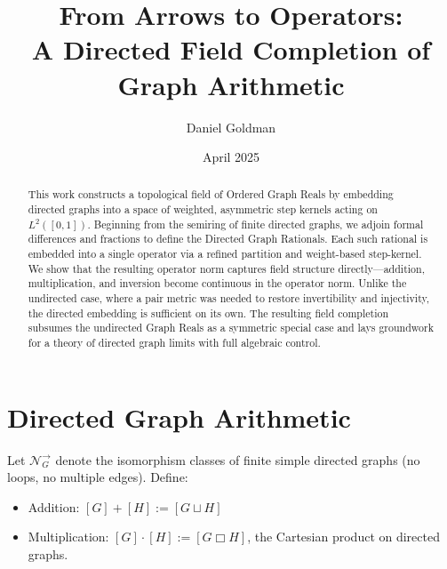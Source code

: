 \documentclass[11pt]{article}
\title{\bfseries From Arrows to Operators:\\A Directed Field Completion of Graph Arithmetic}
\author{Daniel Goldman}
\date{April 2025}
\theoremstyle{definition}
\theoremstyle{plain}
\theoremstyle{remark}
\begin{document}
\maketitle

\begin{center}
\end{center}
\vspace{1em}

\begin{abstract}
This work constructs a topological field of Ordered Graph Reals by embedding directed graphs into a space of weighted, asymmetric step kernels acting on \( L^2([0,1]) \). Beginning from the semiring of finite directed graphs, we adjoin formal differences and fractions to define the Directed Graph Rationals. Each such rational is embedded into a single operator via a refined partition and weight-based step-kernel. We show that the resulting operator norm captures field structure directly—addition, multiplication, and inversion become continuous in the operator norm. Unlike the undirected case, where a pair metric was needed to restore invertibility and injectivity, the directed embedding is sufficient on its own. The resulting field completion subsumes the undirected Graph Reals as a symmetric special case and lays groundwork for a theory of directed graph limits with full algebraic control.
\end{abstract}

\section{Directed Graph Arithmetic}

Let \( \mathcal{N}_G^\to \) denote the isomorphism classes of finite simple directed graphs (no loops, no multiple edges). Define:

\begin{itemize}
  \item Addition: \( [G] + [H] := [G \sqcup H] \)
  \item Multiplication: \( [G] \cdot [H] := [G \Box H] \), the Cartesian product on directed graphs.
\end{itemize}
\end{document}
